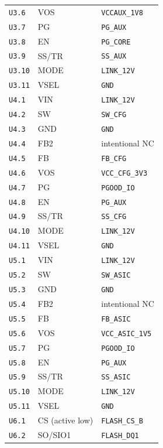 \documentclass[11pt,a4paper]{article}
\begin{document}
\begin{longtable}{@{}P{25mm}P{62mm}P{83mm}@{}}
\nolinkurl{U3.6} & VOS & \nolinkurl{VCCAUX_1V8} \\
\nolinkurl{U3.7} & PG & \nolinkurl{PG_AUX} \\
\nolinkurl{U3.8} & EN & \nolinkurl{PG_CORE} \\
\nolinkurl{U3.9} & SS/TR & \nolinkurl{SS_AUX} \\
\nolinkurl{U3.10} & MODE & \nolinkurl{LINK_12V} \\
\nolinkurl{U3.11} & VSEL & \nolinkurl{GND} \\
\nolinkurl{U4.1} & VIN & \nolinkurl{LINK_12V} \\
\nolinkurl{U4.2} & SW & \nolinkurl{SW_CFG} \\
\nolinkurl{U4.3} & GND & \nolinkurl{GND} \\
\nolinkurl{U4.4} & FB2 & \textcolor{muted}{intentional NC} \\
\nolinkurl{U4.5} & FB & \nolinkurl{FB_CFG} \\
\nolinkurl{U4.6} & VOS & \nolinkurl{VCC_CFG_3V3} \\
\nolinkurl{U4.7} & PG & \nolinkurl{PGOOD_IO} \\
\nolinkurl{U4.8} & EN & \nolinkurl{PG_AUX} \\
\nolinkurl{U4.9} & SS/TR & \nolinkurl{SS_CFG} \\
\nolinkurl{U4.10} & MODE & \nolinkurl{LINK_12V} \\
\nolinkurl{U4.11} & VSEL & \nolinkurl{GND} \\
\nolinkurl{U5.1} & VIN & \nolinkurl{LINK_12V} \\
\nolinkurl{U5.2} & SW & \nolinkurl{SW_ASIC} \\
\nolinkurl{U5.3} & GND & \nolinkurl{GND} \\
\nolinkurl{U5.4} & FB2 & \textcolor{muted}{intentional NC} \\
\nolinkurl{U5.5} & FB & \nolinkurl{FB_ASIC} \\
\nolinkurl{U5.6} & VOS & \nolinkurl{VCC_ASIC_1V5} \\
\nolinkurl{U5.7} & PG & \nolinkurl{PGOOD_IO} \\
\nolinkurl{U5.8} & EN & \nolinkurl{PG_AUX} \\
\nolinkurl{U5.9} & SS/TR & \nolinkurl{SS_ASIC} \\
\nolinkurl{U5.10} & MODE & \nolinkurl{LINK_12V} \\
\nolinkurl{U5.11} & VSEL & \nolinkurl{GND} \\
\nolinkurl{U6.1} & CS (active low) & \nolinkurl{FLASH_CS_B} \\
\nolinkurl{U6.2} & SO/SIO1 & \nolinkurl{FLASH_DQ1} \\

\end{longtable}
\end{document}

